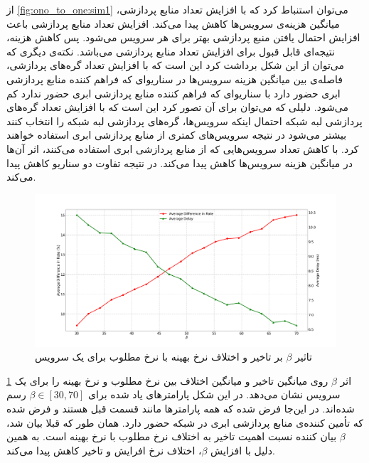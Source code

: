     از \cref{fig:ono_to_one:sim1} می‌توان استنباط کرد که با افزایش تعداد منابع پردازشی، میانگین هزینه‌ی سرویس‌ها کاهش پیدا می‌کند.
    افزایش تعداد منابع پردازشی باعث افزایش احتمال یافتن منبع پردازشی بهتر برای هر سرویس می‌شود.
    پس کاهش هزینه، نتیجه‌ای قابل قبول برای افزایش تعداد منابع پردازشی می‌باشد.
    نکته‌ی دیگری که می‌توان از این شکل برداشت کرد این است که با افزایش تعداد گره‌های پردازشی، فاصله‌ی بین میانگین هزینه سرویس‌ها در سناریو‌ای که فراهم کننده منابع پردازشی ابری حضور دارد با سناریو‌ای که فراهم کننده منابع پردازشی ابری حضور ندارد کم می‌شود.
    دلیلی که می‌توان برای آن تصور کرد این است که با افزایش تعداد گره‌های پردازشی لبه شبکه احتمال اینکه سرویس‌ها، گره‌های پردازشی لبه شبکه را انتخاب کنند بیشتر می‌شود در نتیجه سرویس‌های کمتری از منابع پردازشی ابری استفاده خواهند کرد.
    با کاهش تعداد سرویس‌هایی که از منابع پردازشی ابری استفاده می‌کنند، اثر آن‌ها در میانگین هزینه سرویس‌ها کاهش پیدا می‌کند.
    در نتیجه تفاوت دو سناریو کاهش پیدا می‌کند.

    \begin{figure}
      \centerline{\includegraphics[width=17cm]{graphics/one_to_one/sim_2}}
      \caption{تاثیر $\beta$ بر تاخیر و اختلاف نرخ بهینه با نرخ مطلوب برای یک سرویس}
      \label{fig:ono_to_one:sim2}
    \end{figure}

    \cref{fig:ono_to_one:sim2} اثر $\beta$ روی میانگین تاخیر و میانگین اختلاف بین نرخ مطلوب و نرخ بهینه را برای یک سرویس نشان می‌دهد.
    در این شکل پارامتر‌های یاد شده برای $\beta \in [30, 70]$ رسم شده‌اند.
    در این‌جا فرض شده که همه پارامتر‌ها مانند قسمت قبل هستند و فرض شده که تأمین کننده‌ی منابع پردازشی ابری در شبکه حضور دارد.
    همان طور که قبلا بیان شد، $\beta$ بیان کننده نسبت اهمیت تاخیر به اختلاف نرخ مطلوب با نرخ بهینه است.
    به همین دلیل با افزایش $\beta$، اختلاف نرخ افرایش و تاخیر کاهش پیدا می‌کند.
    
